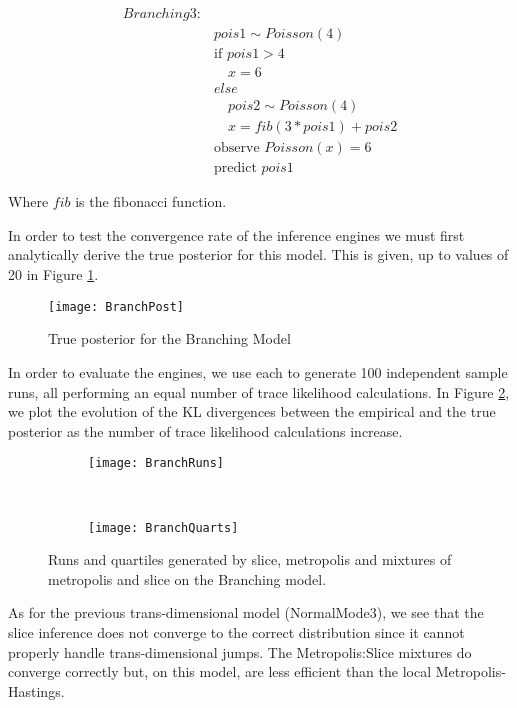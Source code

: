 \begin{align*}
  Branching3:
  \\& pois1 \sim Poisson(4)
  \\&\text{if }pois1 > 4
  \\&\quad x = 6
  \\&else
  \\&\quad pois2 \sim Poisson(4)
  \\&\quad x = fib(3 * pois1) + pois2
  \\&\text{observe }Poisson(x) = 6
  \\&\text{predict }pois1
\end{align*}

Where $fib$ is the fibonacci function. 

In order to test the convergence rate of the inference engines we must first analytically derive the true posterior for this model. This is given, up to values of 20 in Figure \ref{fig:BranchPost}.

\begin{figure}[h]
    \centering
    \texttt{[image: BranchPost]}
    \caption{True posterior for the Branching Model}
    \label{fig:BranchPost}
\end{figure}

In order to evaluate the engines, we use each to generate 100 independent sample runs, all performing an equal number of trace likelihood calculations. In Figure \ref{fig:branchPerf}, we plot the evolution of the KL divergences between the empirical and the true posterior as the number of trace likelihood calculations increase.

\begin{figure}[h]
        \centering
        \begin{subfigure}[b]{0.48\textwidth}
                \centering
                \texttt{[image: BranchRuns]}
        \end{subfigure}
        ~ 
        \begin{subfigure}[b]{0.48\textwidth}
                \centering
                \texttt{[image: BranchQuarts]}
        \end{subfigure}
    \caption{Runs and quartiles generated by slice, metropolis and mixtures of metropolis and slice on the Branching model.}
    \label{fig:branchPerf}
\end{figure}

As for the previous trans-dimensional model (NormalMode3), we see that the slice inference does not converge to the correct distribution since it cannot properly handle trans-dimensional jumps. The Metropolis:Slice mixtures do converge correctly but, on this model, are less efficient than the local Metropolis-Hastings.

